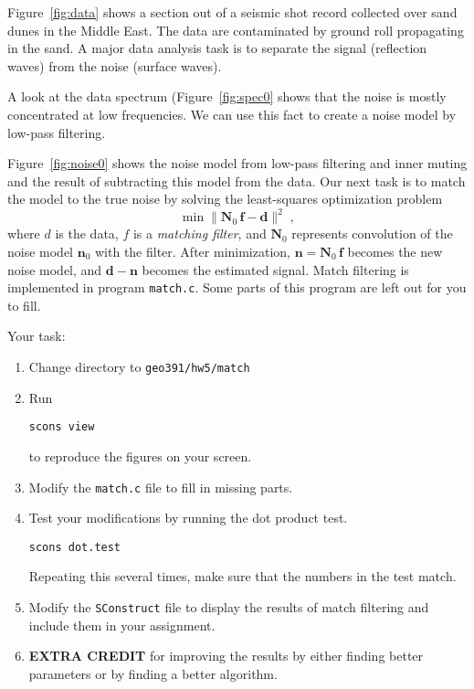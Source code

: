 
Figure~\ref{fig:data} shows a section out of a seismic shot record
collected over sand dunes in the Middle East. The data are
contaminated by ground roll propagating in the sand. A major data
analysis task is to separate the signal (reflection waves) from the
noise (surface waves).


A look at the data spectrum (Figure~\ref{fig:spec0} shows that the
noise is mostly concentrated at low frequencies. We can use this fact
to create a noise model by low-pass filtering.


Figure~\ref{fig:noise0} shows the noise model from low-pass filtering
and inner muting and the result of subtracting this model from the
data. Our next task is to match the model to the true noise by solving
the least-squares optimization problem
\begin{equation}
\label{eq:ls}
\min \|\mathbf{N}_0\,\mathbf{f} - \mathbf{d}\|^2\;,
\end{equation}
where $d$ is the data, $f$ is a \emph{matching filter}, and
$\mathbf{N}_0$ represents convolution of the noise model
$\mathbf{n}_0$ with the filter. After minimization, $\mathbf{n} =
\mathbf{N}_0\,\mathbf{f}$ becomes the new noise model, and
$\mathbf{d}-\mathbf{n}$ becomes the estimated signal. Match filtering
is implemented in program \texttt{match.c}. Some parts of this program
are left out for you to fill.

\lstset{language=c,numbers=left,numberstyle=\tiny,showstringspaces=false}


Your task:
\begin{enumerate}
\item Change directory to \verb#geo391/hw5/match#
\item Run 
\begin{verbatim}
scons view
\end{verbatim}
to reproduce the figures on your screen.
\item Modify the \texttt{match.c} file to fill in missing parts.
\item Test your modifications by running the dot product test.
\begin{verbatim}
scons dot.test
\end{verbatim}
Repeating this several times, make sure that the numbers in the test match.
\item  Modify the \texttt{SConstruct} file to display the results of match filtering
and include them in your assignment.
\item \textbf{EXTRA CREDIT} for improving the results by either finding better parameters or by finding a better algorithm. 
\end{enumerate}

